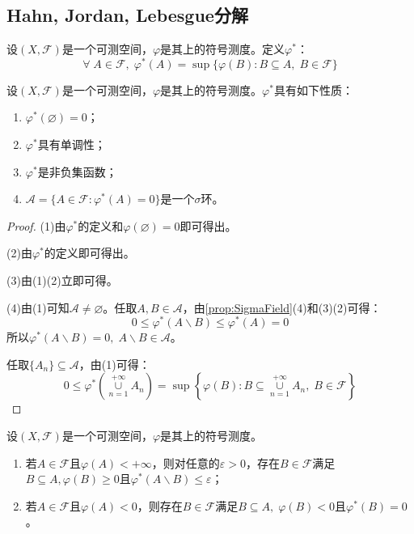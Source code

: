 \subsection{Hahn, Jordan, Lebesgue分解}
\begin{definition}
	 设$(X,\mathscr{F})$是一个可测空间，$\varphi$是其上的符号测度。定义$\varphi^*$：
	\begin{equation*}
		\forall\;A\in\mathscr{F},\;\varphi^*(A)=\sup\{\varphi(B):B\subseteq A,\;B\in\mathscr{F}\}
	\end{equation*}
\end{definition}
\begin{property}\label{prop:varphi*}
	设$(X,\mathscr{F})$是一个可测空间，$\varphi$是其上的符号测度。$\varphi^*$具有如下性质：
	\begin{enumerate}
		\item $\varphi^*(\varnothing)=0$；
		\item $\varphi^*$具有单调性；
		\item $\varphi^*$是非负集函数；
		\item $\mathscr{A}=\{A\in\mathscr{F}:\varphi^*(A)=0\}$是一个$\sigma$环。
	\end{enumerate}
\end{property}
\begin{proof}
	(1)由$\varphi^*$的定义和$\varphi(\varnothing)=0$即可得出。\par
	(2)由$\varphi^* $的定义即可得出。\par
	(3)由(1)(2)立即可得。\par
	(4)由(1)可知$\mathscr{A}\ne\varnothing$。任取$A,B\in\mathscr{A}$，由\cref{prop:SigmaField}(4)和(3)(2)可得：
	\begin{equation*}
		0\leqslant\varphi^*(A\backslash B)\leqslant\varphi^*(A)=0
	\end{equation*}
	所以$\varphi^*(A\backslash B)=0,\;A\backslash B\in\mathscr{A}$。\par
	任取$\{A_n\}\subseteq\mathscr{A}$，由(1)可得：
	\begin{equation*}
		0\leqslant\varphi^*\left(\underset{n=1}{\overset{+\infty}{\cup}}A_n\right)=\sup\left\{\varphi(B):B\subseteq\underset{n=1}{\overset{+\infty}{\cup}}A_n,\;B\in\mathscr{F}\right\}
	\end{equation*}
\end{proof}
\begin{lemma}
	设$(X,\mathscr{F})$是一个可测空间，$\varphi$是其上的符号测度。
	\begin{enumerate}
		\item 若$A\in\mathscr{F}$且$\varphi(A)<+\infty$，则对任意的$\varepsilon>0$，存在$B\in\mathscr{F}$满足$B\subseteq A,\varphi(B)\geqslant0$且$\varphi^*(A\backslash B)\leqslant\varepsilon$；
		\item 若$A\in\mathscr{F}$且$\varphi(A)<0$，则存在$B\in\mathscr{F}$满足$B\subseteq A,\;\varphi(B)<0$且$\varphi^*(B)=0$。
	\end{enumerate}
\end{lemma}
